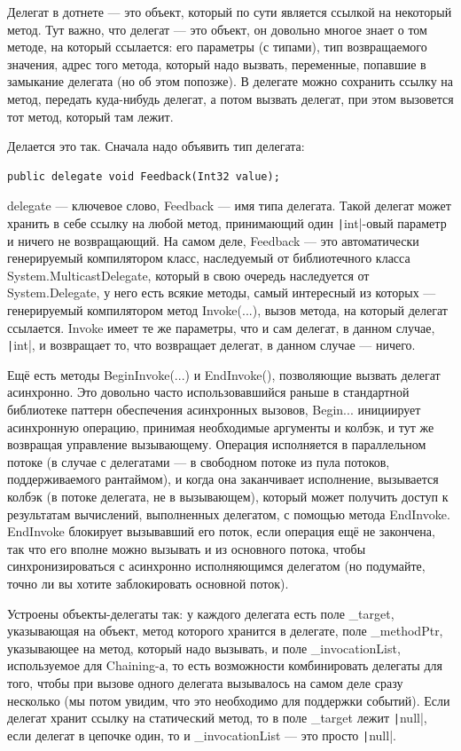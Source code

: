 \documentclass[a5paper]{article}
\begin{document}
Делегат в дотнете --- это объект, который по сути является ссылкой на некоторый метод. Тут важно, что делегат --- это объект, он довольно многое знает о том методе, на который ссылается: его параметры (с типами), тип возвращаемого значения, адрес того метода, который надо вызвать, переменные, попавшие в замыкание делегата (но об этом попозже). В делегате можно сохранить ссылку на метод, передать куда-нибудь делегат, а потом вызвать делегат, при этом вызовется тот метод, который там лежит. 

Делается это так. Сначала надо объявить тип делегата:

\begin{verbatim}
public delegate void Feedback(Int32 value);
\end{verbatim}

delegate --- ключевое слово, Feedback --- имя типа делегата. Такой делегат может хранить в себе ссылку на любой метод, принимающий один \texttt|int|-овый параметр и ничего не возвращающий. На самом деле, Feedback --- это автоматически генерируемый компилятором класс, наследуемый от библиотечного класса System.MulticastDelegate, который в свою очередь наследуется от System.Delegate, у него есть всякие методы, самый интересный из которых --- генерируемый компилятором метод Invoke(...), вызов метода, на который делегат ссылается. Invoke имеет те же параметры, что и сам делегат, в данном случае, \texttt|int|, и возвращает то, что возвращает делегат, в данном случае --- ничего. 

Ещё есть методы BeginInvoke(...) и EndInvoke(), позволяющие вызвать делегат асинхронно. Это довольно часто использовавшийся раньше в стандартной библиотеке паттерн обеспечения асинхронных вызовов, Begin... инициирует асинхронную операцию, принимая необходимые аргументы и колбэк, и тут же возвращая управление вызывающему. Операция исполняется в параллельном потоке (в случае с делегатами --- в свободном потоке из пула потоков, поддерживаемого рантаймом), и когда она заканчивает исполнение, вызывается колбэк (в потоке делегата, не в вызывающем), который может получить доступ к результатам вычислений, выполненных делегатом, с помощью метода EndInvoke. EndInvoke блокирует вызывавший его поток, если операция ещё не закончена, так что его вполне можно вызывать и из основного потока, чтобы синхронизироваться с асинхронно исполняющимся делегатом (но подумайте, точно ли вы хотите заблокировать основной поток).

Устроены объекты-делегаты так: у каждого делегата есть поле \_target, указывающая на объект, метод которого хранится в делегате, поле \_methodPtr, указывающее на метод, который надо вызывать, и поле \_invocationList, используемое для Chaining-а, то есть возможности комбинировать делегаты для того, чтобы при вызове одного делегата вызывалось на самом деле сразу несколько (мы потом увидим, что это необходимо для поддержки событий). Если делегат хранит ссылку на статический метод, то в поле \_target лежит \texttt|null|, если делегат в цепочке один, то и \_invocationList --- это просто \texttt|null|.
\end{document}
